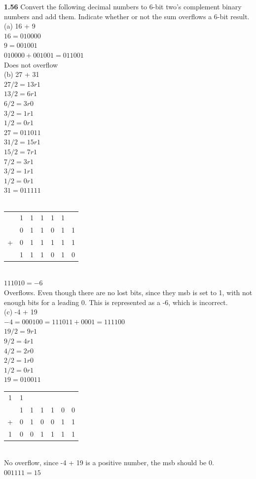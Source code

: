 \documentclass[12pt,a4paper]{report}
\begin{document}
\begin{normalsize}
\textbf{1.56} Convert the following decimal numbers to 6-bit two's complement binary numbers and add them. Indicate whether or not the sum overflows a 6-bit result. \\
(a) 16 + 9 \\
$ 16 = 010000 $ \\
$ 9 = 001001 $ \\
$ 010000 + 001001 = 011001 $ \\
Does not overflow \\

(b) 27 + 31 \\
$ 27/2 = 13r1 $ \\
$ 13/2 = 6r1 $ \\
$ 6/2 = 3r0 $ \\
$ 3/2 = 1r1 $ \\
$ 1/2 = 0r1 $ \\
$ 27 = 011011 $ \\
$ 31/2 = 15r1 $ \\
$ 15/2 = 7r1 $ \\
$ 7/2 = 3r1 $ \\
$ 3/2 = 1r1 $ \\
$ 1/2 = 0r1 $ \\
$ 31 = 011111 $ \\ \\
\begin{tabular}{c@{\,}c@{\,}c@{\,}c@{\,}c@{\,}c@{\,}c}
  & 1 & 1 & 1 & 1 & 1 & \\
  & 0 & 1 & 1 & 0 & 1 & 1 \\
+ & 0 & 1 & 1 & 1 & 1 & 1 \\
\hline
  & 1 & 1 & 1 & 0 & 1 & 0 \\
\end{tabular} \\
$ 111010 = -6 $ \\
Overflows. Even though there are no lost bits, since they msb is set to 1, with not enough bits for a leading 0. This is represented as a -6, which is incorrect. \\

(c) -4 + 19 \\
$ -4 = 000100 = 111011 + 0001 = 111100 $ \\
$ 19/2 = 9r1 $ \\
$ 9/2 = 4r1 $ \\
$ 4/2 = 2r0 $ \\
$ 2/2 = 1r0 $ \\
$ 1/2 = 0r1$ \\
$ 19 = 010011 $ \\ 
\begin{tabular}{c@{\,}c@{\,}c@{\,}c@{\,}c@{\,}c@{\,}c}
1 & 1 &   &   &   &   & \\
  & 1 & 1 & 1 & 1 & 0 & 0 \\
+ & 0 & 1 & 0 & 0 & 1 & 1 \\
\hline
1 & 0 & 0 & 1 & 1 & 1 & 1 \\
\end{tabular} \\
No overflow, since -4 + 19 is a positive number, the msb should be 0. \\
$ 001111 = 15 $ \\


\end{normalsize}
\end{document}
